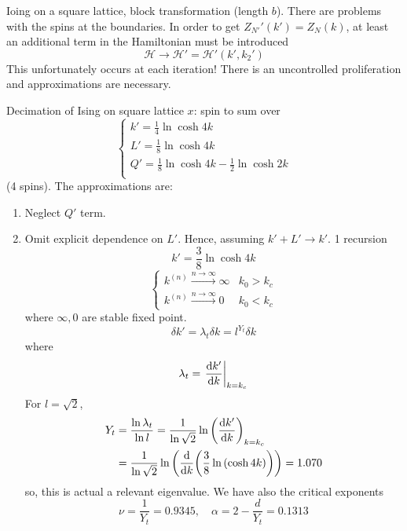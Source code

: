 \documentclass[../main/main.tex]{subfiles}
\begin{document}
Ioing on a square lattice, block transformation (length \( b \)). There are problems with the spins at the boundaries.
In order to get \( Z_{N'}' (k') = Z_N (k) \), at least an additional term in the Hamiltonian must be introduced
\begin{equation}
  \mathcal{H} \rightarrow \mathcal{H}' = \mathcal{H}' (k',k_2')
\end{equation}
This unfortunately occurs at each iteration! There is an uncontrolled proliferation and approximations are necessary.
\begin{example}{Decimation of Ising on square lattice}{}
  \( x \): spin to sum over
\begin{equation}
  \begin{cases}
   k' = \frac{1}{4} \ln{\cosh 4 k} \\
   L' = \frac{1}{8} \ln{\cosh 4 k} \\
   Q' = \frac{1}{8} \ln{\cosh 4 k} - \frac{1}{2} \ln{\cosh 2 k}\\
  \end{cases}
\end{equation}
(4 spins). The approximations are:
\begin{enumerate}
\item Neglect \( Q' \) term.
\item Omit explicit dependence on \( L' \). Hence, assuming \( k'+L' \rightarrow k' \). 1 recursion
\begin{equation}
  k' = \frac{3}{8} \ln{\cosh 4 k}
\end{equation}
\begin{equation}
  \begin{cases}
   k^{(n)} \overset{n \rightarrow \infty }{\longrightarrow} \infty  & k_0 > k_c \\
   k^{(n)} \overset{n \rightarrow \infty }{\longrightarrow} 0  & k_0 < k_c
  \end{cases}
\end{equation}
where \( \infty ,0 \) are stable fixed point.
\begin{equation}
  \delta k' = \lambda _t \delta k = l^{Y _t} \delta k
\end{equation}
where
\begin{equation}
  \lambda _t = \eval{\dv{k'}{k} }_{k=k_c}
\end{equation}
For \( l = \sqrt{2}  \),
\begin{equation}
\begin{split}
Y_t  &= \frac{\ln{\lambda _t} }{\ln{l} } = \frac{1}{\ln{\sqrt{2} } } \ln{\qty(\dv{k'}{k})_{k=k_c} }   \\
& = \frac{1}{\ln{\sqrt{2} } }  \ln{\qty(\dv{}{k} \qty(\frac{3}{8} \ln{(\cosh 4k)} ) ) } = 1.070
\end{split}
\end{equation}
so, this is actual a relevant eigenvalue.
We have also the critical exponents
\begin{equation}
  \nu = \frac{1}{Y_t} = 0.9345, \quad \alpha = 2 - \frac{d}{Y_t} = 0.1313
\end{equation}
\end{enumerate}

\end{example}
\end{document}
